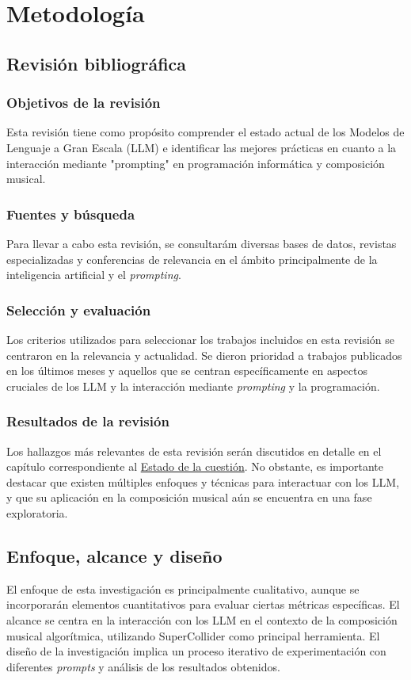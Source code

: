 \chapter{Metodología}

\section{Revisión bibliográfica}

\subsection{Objetivos de la revisión}
Esta revisión tiene como propósito comprender el estado actual de los Modelos de Lenguaje a Gran Escala (LLM) e identificar las mejores prácticas en cuanto a la interacción mediante "prompting" en programación informática y composición musical.

\subsection{Fuentes y búsqueda}
Para llevar a cabo esta revisión, se consultarám diversas bases de datos, revistas especializadas y conferencias de relevancia en el ámbito principalmente de la inteligencia artificial y el \textit{prompting}.

\subsection{Selección y evaluación}
Los criterios utilizados para seleccionar los trabajos incluidos en esta revisión se centraron en la relevancia y actualidad. Se dieron prioridad a trabajos publicados en los últimos meses y aquellos que se centran específicamente en aspectos cruciales de los LLM y la interacción mediante \textit{prompting} y la programación.

\subsection{Resultados de la revisión}
Los hallazgos más relevantes de esta revisión serán discutidos en detalle en el capítulo correspondiente al \hyperref[chap:estado_cuestion]{Estado de la cuestión}. No obstante, es importante destacar que existen múltiples enfoques y técnicas para interactuar con los LLM, y que su aplicación en la composición musical aún se encuentra en una fase exploratoria.

\section{Enfoque, alcance y diseño}
El enfoque de esta investigación es principalmente cualitativo, aunque se incorporarán elementos cuantitativos para evaluar ciertas métricas específicas. El alcance se centra en la interacción con los LLM en el contexto de la composición musical algorítmica, utilizando SuperCollider como principal herramienta. El diseño de la investigación implica un proceso iterativo de experimentación con diferentes \textit{prompts} y análisis de los resultados obtenidos.

